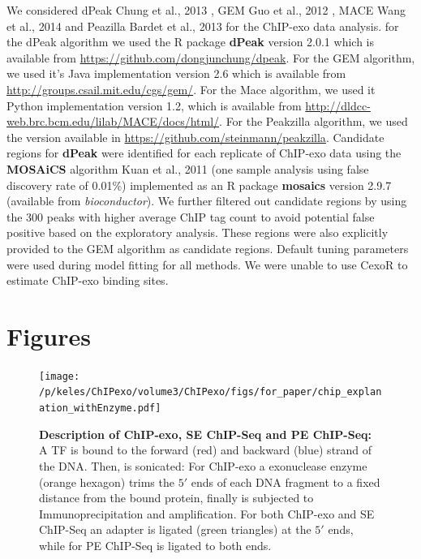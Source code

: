 \documentclass{bmcart}\usepackage[]{graphicx}\usepackage[]{color}
\begin{document}
We considered dPeak Chung et al., 2013 \cite{dpeak}, GEM Guo et al.,
2012 \cite{gem}, MACE Wang et al., 2014 \cite{mace} and Peazilla
Bardet et al., 2013 \cite{peakzilla} for the ChIP-exo data
analysis. for the dPeak algorithm we used the R package \textbf{dPeak}
version 2.0.1 which is available from
\url{https://github.com/dongjunchung/dpeak}. For the GEM algorithm, we
used it's Java implementation version 2.6 which is available from
\url{http://groups.csail.mit.edu/cgs/gem/}. For the Mace algorithm, we
used it Python implementation version 1.2, which is available from
\url{http://dldcc-web.brc.bcm.edu/lilab/MACE/docs/html/}. For the
Peakzilla algorithm, we used the version available in
\url{https://github.com/steinmann/peakzilla}. Candidate regions for
\textbf{dPeak} were identified for each replicate of ChIP-exo data
using the \textbf{MOSAiCS} algorithm Kuan et al., 2011 \cite{mosaics}
(one sample analysis using false discovery rate of 0.01\%)
implemented as an R package \textbf{mosaics} version 2.9.7 (available
from \emph{bioconductor}). We further filtered out candidate regions
by using the 300 peaks with higher average ChIP tag count to
avoid potential false positive based on the exploratory
analysis. These regions were also explicitly provided to the GEM
algorithm as candidate regions. Default tuning parameters were used
during model fitting for all methods. We were unable to use CexoR
\cite{cexor} to estimate ChIP-exo binding sites.


\nocite{exo_gb}
\nocite{maplot1}
\nocite{maplot2}
\nocite{chipbeyond}



\newpage

\section{Figures}

\begin{figure}[h!]
  \centering
  \texttt{[image: /p/keles/ChIPexo/volume3/ChIPexo/figs/for\_paper/chip\_explanation\_withEnzyme.pdf]}
  \caption{\textbf{Description of ChIP-exo, SE ChIP-Seq and PE
      ChIP-Seq:} A TF is bound to the forward (red) and backward
    (blue) strand of the DNA. Then, is sonicated: For ChIP-exo a
    exonuclease enzyme (orange hexagon) trims the $5\prime$ ends of
    each DNA fragment to a fixed distance from the bound protein,
    finally is subjected to Immunoprecipitation and amplification. For
    both ChIP-exo and SE ChIP-Seq an adapter is ligated (green
    triangles) at the $5\prime$ ends, while for PE ChIP-Seq is ligated
    to both ends.}
  \label{fig:chip_diagram}
\end{figure}
\newpage
\end{document}
